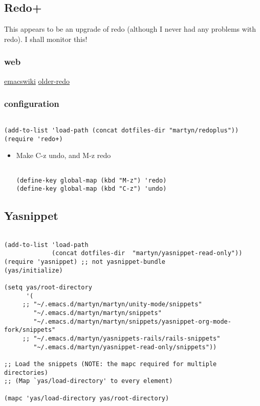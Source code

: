 \documentclass[colorlinks=true,urlcolor=blue,listings-sv]{article}
\begin{document}
\subsection{Redo+}
\label{sec-1-38}

This appears to be an upgrade of redo (although I never had any
problems with redo). I shall monitor this!
\subsubsection{web}
\label{sec-1-38-1}

\href{http://www.emacswiki.org/emacs/RedoPlus}{ emacswiki}
\href{http://www.emacswiki.org/emacs/RedoMode}{older-redo}
\subsubsection{configuration}
\label{sec-1-38-2}



\lstset{language=Lisp}
\begin{lstlisting}

(add-to-list 'load-path (concat dotfiles-dir "martyn/redoplus"))
(require 'redo+)
\end{lstlisting}
    
    
\begin{itemize}

\item Make C-z undo, and M-z redo\\
\label{sec-1-38-2-1}%
\lstset{language=Lisp}
\begin{lstlisting}

(define-key global-map (kbd "M-z") 'redo)
(define-key global-map (kbd "C-z") 'undo)
\end{lstlisting}

\end{itemize} %
\subsection{Yasnippet}
\label{sec-1-39}



\lstset{language=Lisp}
\begin{lstlisting}

(add-to-list 'load-path
             (concat dotfiles-dir  "martyn/yasnippet-read-only"))
(require 'yasnippet) ;; not yasnippet-bundle
(yas/initialize)

(setq yas/root-directory 
      '(
     ;; "~/.emacs.d/martyn/martyn/unity-mode/snippets"
        "~/.emacs.d/martyn/martyn/snippets"
        "~/.emacs.d/martyn/martyn/snippets/yasnippet-org-mode-fork/snippets"
     ;; "~/.emacs.d/martyn/yasnippets-rails/rails-snippets"
        "~/.emacs.d/martyn/yasnippet-read-only/snippets"))

;; Load the snippets (NOTE: the mapc required for multiple directories)
;; (Map `yas/load-directory' to every element)

(mapc 'yas/load-directory yas/root-directory)
\end{lstlisting}
\end{document}
